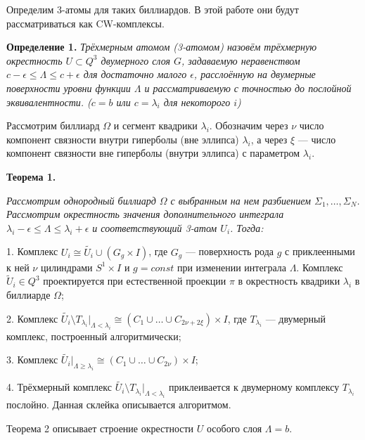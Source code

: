 Определим 3-атомы для таких биллиардов. В этой работе они будут рассматриваться как CW-комплексы.

\textbf{Определение 1.} { \it Трёхмерным атомом (3-атомом) назо\-вём трёхмерную окрестность $U \subset Q^3$ двумерного слоя $G$, зада\-ваемую неравенством $c - \epsilon \leq \Lambda \leq c + \epsilon$ для достаточно малого $\epsilon$, расслоённую на двумерные поверхности уровни функции $\Lambda$ и рассматриваемую с точностью до послойной экви\-вален\-тности. ($c = b$ или $c = \lambda_i$ для некоторого $i$)}

Рассмотрим биллиард $\Omega$ и сегмент квадрики $\lambda_i$. Обоз\-начим через $\nu$ число компонент связности внутри гиперболы (вне эллипса) $\lambda_i$, а через $\xi$ --- число компонент связности вне гиперболы (внутри эллипса) с параметром $\lambda_i$.

\textbf{Теорема 1.}
	{\it Рассмотрим однородный биллиард $\Omega$ с выб\-ран\-ным на нем разбиением $\Sigma_1, \ldots, \Sigma_N$. Рассмотрим окрест\-ность значения дополнительного интеграла $\lambda_i - \epsilon \leq \Lambda \leq \lambda_i + \epsilon$ и соответствующий 3-атом $U_i$. Тогда:

	1. Комплекс $U_i \cong \tilde{U_i} \cup (G_g \times I)$, где $G_g$ --- поверхность рода $g$ с приклеенными к ней $\nu$ цилиндрами $S^1 \times I$ и $g = const$ при изменении интеграла $\Lambda$. Комплекс $\tilde U_i \in Q^3$ проектируется при естественной проекции $\pi$ в окрестность квадрики $\lambda_i$ в биллиарде $\Omega$;

	2. Комплекс $\tilde{U_i} \setminus T_{\lambda_i} |_{\Lambda < \lambda_i} \cong (C_1 \cup \ldots \cup C_{2\nu+2\xi}) \times I$, где $T_{\lambda_i} $ --- двумерный комплекс, построенный алгорит\-мически;

	3. Комплекс $\tilde{U_i} |_{\Lambda \geq \lambda_i} \cong (C_1 \cup \ldots \cup C_{2\nu}) \times I$;

	4. Трёхмерный комплекс $\tilde{U_i} \setminus T_{\lambda_i} |_{\Lambda < \lambda_i}$ прик\-леи\-вается к двумерному комплексу $T_{\lambda_i}$ послойно. Данная склей\-ка описы\-вается алгоритмом.
}

Теорема 2 описывает строение окрестности $U$ особого слоя $\Lambda = b$.

